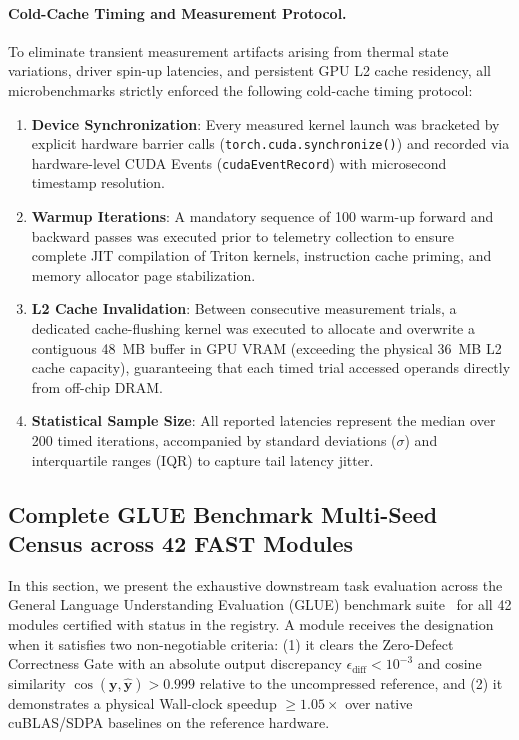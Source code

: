 \paragraph{Cold-Cache Timing and Measurement Protocol.}
To eliminate transient measurement artifacts arising from thermal state variations, driver spin-up latencies, and persistent GPU L2 cache residency, all microbenchmarks strictly enforced the following cold-cache timing protocol:
\begin{enumerate}
    \item \textbf{Device Synchronization}: Every measured kernel launch was bracketed by explicit hardware barrier calls (\texttt{torch.cuda.synchronize()}) and recorded via hardware-level CUDA Events (\texttt{cudaEventRecord}) with microsecond timestamp resolution.
    \item \textbf{Warmup Iterations}: A mandatory sequence of 100 warm-up forward and backward passes was executed prior to telemetry collection to ensure complete JIT compilation of Triton kernels, instruction cache priming, and memory allocator page stabilization.
    \item \textbf{L2 Cache Invalidation}: Between consecutive measurement trials, a dedicated cache-flushing kernel was executed to allocate and overwrite a contiguous 48~MB buffer in GPU VRAM (exceeding the physical 36~MB L2 cache capacity), guaranteeing that each timed trial accessed operands directly from off-chip DRAM.
    \item \textbf{Statistical Sample Size}: All reported latencies represent the median over 200 timed iterations, accompanied by standard deviations ($\sigma$) and interquartile ranges (IQR) to capture tail latency jitter.
\end{enumerate}

\subsection{Complete GLUE Benchmark Multi-Seed Census across 42 FAST Modules}
\label{subsec:app_e_glue_census}

In this section, we present the exhaustive downstream task evaluation across the General Language Understanding Evaluation (GLUE) benchmark suite~\cite{wang2018glue} for all 42 modules certified with \passfast{} status in the \neuralops{} registry. A module receives the \passfast{} designation when it satisfies two non-negotiable criteria: (1) it clears the Zero-Defect Correctness Gate with an absolute output discrepancy $\epsilon_{\text{diff}} < 10^{-3}$ and cosine similarity $\cos(\mathbf{y}, \hat{\mathbf{y}}) > 0.999$ relative to the uncompressed reference, and (2) it demonstrates a physical Wall-clock speedup $\ge 1.05\times$ over native cuBLAS/SDPA baselines on the reference hardware.

